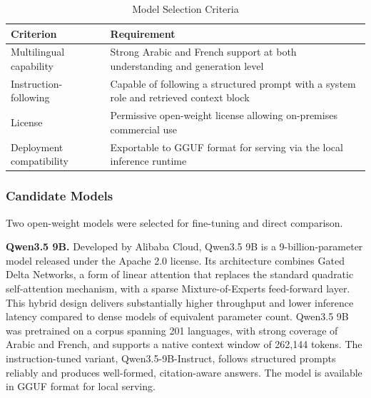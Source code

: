 \begin{table}[H]
\centering
\caption{Model Selection Criteria}
\label{tab:model-selection-criteria}
\renewcommand{\arraystretch}{1.3}
\begin{tabular}{|p{4cm}|p{9cm}|}
\hline
\textbf{Criterion} & \textbf{Requirement} \\
\hline
Multilingual capability &
Strong Arabic and French support at both understanding and generation level \\
\hline
Instruction-following &
Capable of following a structured prompt with a system role and retrieved context block \\
\hline
License &
Permissive open-weight license allowing on-premises commercial use \\
\hline
Deployment compatibility &
Exportable to \ac{GGUF} format for serving via the local inference runtime \\
\hline
\end{tabular}
\end{table}

\subsubsection{Candidate Models}

Two open-weight models were selected for fine-tuning and direct comparison.

\vspace{1em}

\textbf{Qwen3.5 9B.}
Developed by Alibaba Cloud, Qwen3.5 9B \cite{qwen2026qwen35} is a 9-billion-parameter model released under the Apache 2.0 license. Its architecture combines Gated Delta Networks, a form of linear attention that replaces the standard quadratic self-attention mechanism, with a sparse Mixture-of-Experts feed-forward layer. This hybrid design delivers substantially higher throughput and lower inference latency compared to dense models of equivalent parameter count. Qwen3.5 9B was pretrained on a corpus spanning 201 languages, with strong coverage of Arabic and French, and supports a native context window of 262,144 tokens. The instruction-tuned variant, Qwen3.5-9B-Instruct, follows structured prompts reliably and produces well-formed, citation-aware answers. The model is available in \ac{GGUF} format for local serving.

\vspace{1em}

